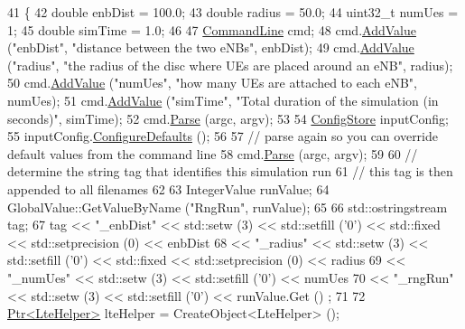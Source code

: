 \begin{DoxyCode}
41 \{
42   \textcolor{keywordtype}{double} enbDist = 100.0;
43   \textcolor{keywordtype}{double} radius = 50.0;
44   uint32\_t numUes = 1;
45   \textcolor{keywordtype}{double} simTime = 1.0;
46 
47   \hyperlink{classns3_1_1CommandLine}{CommandLine} cmd;
48   cmd.\hyperlink{classns3_1_1CommandLine_addcfb546c7ad4c8bd0965654d55beb8e}{AddValue} (\textcolor{stringliteral}{"enbDist"}, \textcolor{stringliteral}{"distance between the two eNBs"}, enbDist);
49   cmd.\hyperlink{classns3_1_1CommandLine_addcfb546c7ad4c8bd0965654d55beb8e}{AddValue} (\textcolor{stringliteral}{"radius"}, \textcolor{stringliteral}{"the radius of the disc where UEs are placed around an eNB"}, radius);
50   cmd.\hyperlink{classns3_1_1CommandLine_addcfb546c7ad4c8bd0965654d55beb8e}{AddValue} (\textcolor{stringliteral}{"numUes"}, \textcolor{stringliteral}{"how many UEs are attached to each eNB"}, numUes);
51   cmd.\hyperlink{classns3_1_1CommandLine_addcfb546c7ad4c8bd0965654d55beb8e}{AddValue} (\textcolor{stringliteral}{"simTime"}, \textcolor{stringliteral}{"Total duration of the simulation (in seconds)"}, simTime);
52   cmd.\hyperlink{classns3_1_1CommandLine_a5c10b85b3207e5ecb48d907966923156}{Parse} (argc, argv);
53 
54   \hyperlink{classns3_1_1ConfigStore}{ConfigStore} inputConfig;
55   inputConfig.\hyperlink{classns3_1_1ConfigStore_a0a6137574d7c847c3823af8b9d1bb886}{ConfigureDefaults} ();
56 
57   \textcolor{comment}{// parse again so you can override default values from the command line}
58   cmd.\hyperlink{classns3_1_1CommandLine_a5c10b85b3207e5ecb48d907966923156}{Parse} (argc, argv);
59 
60   \textcolor{comment}{// determine the string tag that identifies this simulation run}
61   \textcolor{comment}{// this tag is then appended to all filenames}
62 
63   IntegerValue runValue;
64   GlobalValue::GetValueByName (\textcolor{stringliteral}{"RngRun"}, runValue);
65 
66   std::ostringstream tag;
67   tag  << \textcolor{stringliteral}{"\_enbDist"} << std::setw (3) << std::setfill (\textcolor{charliteral}{'0'}) << std::fixed << std::setprecision (0) << 
      enbDist
68        << \textcolor{stringliteral}{"\_radius"}  << std::setw (3) << std::setfill (\textcolor{charliteral}{'0'}) << std::fixed << std::setprecision (0) << 
      radius
69        << \textcolor{stringliteral}{"\_numUes"}  << std::setw (3) << std::setfill (\textcolor{charliteral}{'0'})  << numUes
70        << \textcolor{stringliteral}{"\_rngRun"}  << std::setw (3) << std::setfill (\textcolor{charliteral}{'0'})  << runValue.Get () ;
71 
72   \hyperlink{classns3_1_1Ptr}{Ptr<LteHelper>} lteHelper = CreateObject<LteHelper> ();

\end{DoxyCode}
